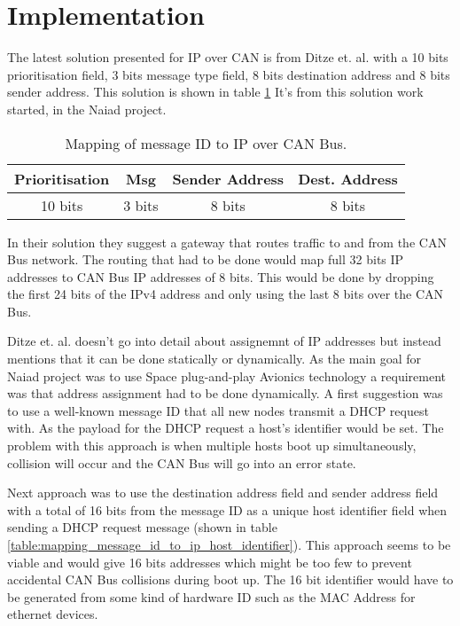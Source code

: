 \section{Implementation}\label{sec:implementation}
The latest solution presented for IP over CAN is from Ditze et. al. with a 10
bits prioritisation field, 3 bits message type field, 8 bits destination
address and 8 bits sender address. This solution is shown in table
\ref{table:mapping_message_id_to_ip} It's from this solution work started,
in the Naiad project.

\begin{table}[h]
\centering
    \caption{Mapping of message ID to IP over CAN Bus.}
    \begin{tabular}{|c|c|c|c|} \hline
    \label{table:mapping_message_id_to_ip}
    Prioritisation & Msg & Sender Address & Dest. Address  \\ \hline
            10 bits & 3 bits & 8 bits & 8 bits \\ \hline
    \end{tabular}
\end{table}


In their solution they suggest a gateway that routes traffic to and from the
CAN Bus network. The routing that had to be done would map full 32 bits IP
addresses to CAN Bus IP addresses of 8 bits. This would be done by dropping the
first 24 bits of the IPv4 address and only using the last 8 bits over the CAN
Bus.

Ditze et. al. doesn't go into
detail about assignemnt of IP addresses
but instead mentions that it can be done statically or dynamically. As the main
goal for Naiad project was to use Space plug-and-play Avionics
technology a requirement was that address assignment had to be done
dynamically. A first suggestion was to use a well-known message ID that all new
nodes transmit a DHCP request with. As the payload for the DHCP request a
host's identifier would be set.
The problem with this approach is when multiple hosts boot up
simultaneously, collision will occur and the CAN Bus will go into an error
state.

Next approach was to use the destination address field and sender address field
with a total of 16 bits from the message ID as a unique host identifier field
when sending a DHCP request message (shown in table
\ref{table:mapping_message_id_to_ip_host_identifier}).
This approach seems to be viable and would
give 16 bits addresses which might be too few to prevent accidental CAN Bus
collisions during boot up. The 16 bit identifier would have to be generated
from some kind of hardware ID such as the MAC Address for ethernet devices.

